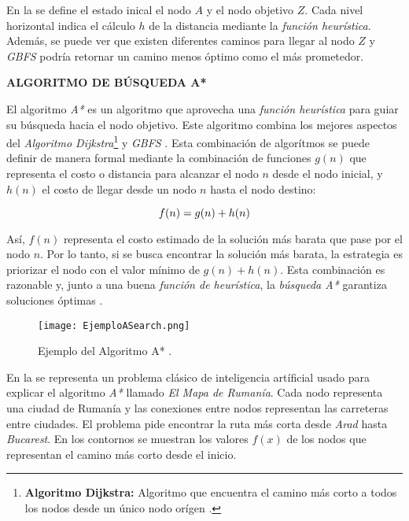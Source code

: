 En la  se define el estado inical el nodo $A$ y el nodo objetivo $Z$. Cada nivel horizontal indica el cálculo $h$ de la distancia mediante la \textit{función heurística}. Además, se puede ver que existen diferentes caminos para llegar al nodo $Z$ y \textit{GBFS} podría retornar un camino menos óptimo como el más prometedor.

\textbf{ALGORITMO DE BÚSQUEDA A*}

El algoritmo \textit{A*} es un algoritmo que aprovecha una \textit{función heurística} para guiar su búsqueda hacia el nodo objetivo. Este algoritmo combina los mejores aspectos del \textit{Algoritmo Dijkstra}\footnote{\textbf{Algoritmo Dijkstra:} Algoritmo que encuentra el camino más corto a todos los nodos desde un único nodo orígen \parencite{javaid2013understanding}.} y \textit{GBFS} \parencite{KumarRAStar}. Esta combinación de algorítmos se puede definir de manera formal mediante la combinación de funciones $g(n)$ que representa el costo o distancia para alcanzar el nodo $n$ desde el nodo inicial, y $h(n)$ el costo de llegar desde un nodo $n$ hasta el nodo destino:

\begin{equation}
    f(n) = g(n) + h(n)
    \addequation{Definición de la función de A*}
\end{equation}

Así, $f(n)$ representa el costo estimado de la solución más barata que pase por el nodo $n$. Por lo tanto, si se busca encontrar la solución más barata, la estrategia es priorizar el nodo con el valor mínimo de $g(n) + h(n)$. Esta combinación es razonable y, junto a una buena \textit{función de heurística}, la \textit{búsqueda A*} garantiza soluciones óptimas \parencite{RusselArtificialIntelligence}. 

\begin{figure}[h!]
    \centering
    \texttt{[image: EjemploASearch.png]}
    \caption{Ejemplo del Algoritmo A* \parencite{RusselArtificialIntelligence}.}
    \label{fig:EjemploAStar}
\end{figure}

\newpage

En la  se representa un problema clásico de inteligencia artíficial usado para explicar el algoritmo \textit{A*} llamado \textit{El Mapa de Rumanía}. Cada nodo representa una ciudad de Rumanía y las conexiones entre nodos representan las carreteras entre ciudades. El problema pide encontrar la ruta más corta desde \textit{Arad} hasta \textit{Bucarest}. En los contornos se muestran los valores $f(x)$ de los nodos que representan el camino más corto desde el inicio.

